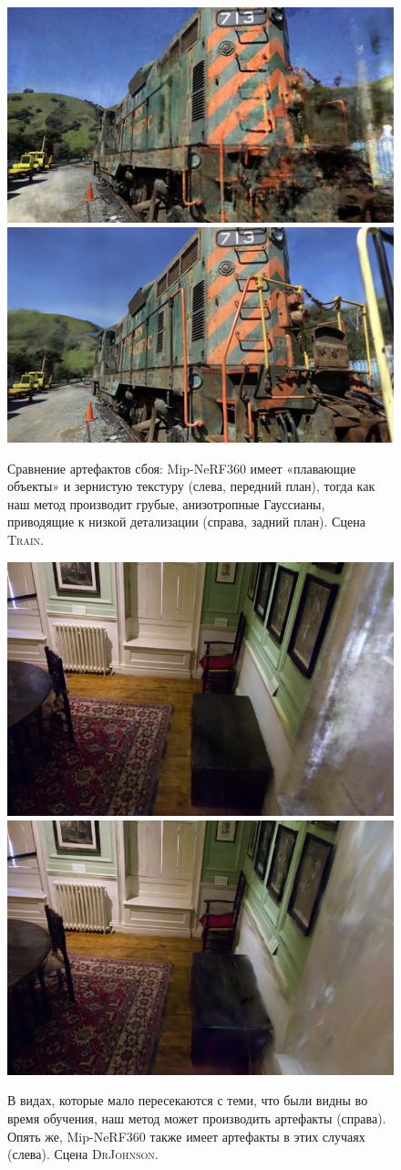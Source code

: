 \begin{figure}[!h]
    \includegraphics[width=0.49\columnwidth]{results/limitations/color_009_s.png}
    \includegraphics[width=0.49\columnwidth]{results/limitations/00073_s.png}
    \caption{
        \label{fig:limit}
        Сравнение артефактов сбоя: Mip-NeRF360 имеет «плавающие объекты» и зернистую текстуру (слева, передний план), тогда как наш метод производит грубые, анизотропные Гауссианы, приводящие к низкой детализации (справа, задний план). Сцена \textsc{Train}.
    }
\end{figure}

\begin{figure}[!h]
    \includegraphics[width=0.49\linewidth]{figures/extremeviews/color_032_s.png}
    \includegraphics[width=0.49\linewidth]{figures/extremeviews/IMG_6589_s.png}
    \caption{
        В видах, которые мало пересекаются с теми, что были видны во время обучения, наш метод может производить артефакты (справа). Опять же, Mip-NeRF360 также имеет артефакты в этих случаях (слева). Сцена \textsc{DrJohnson}.
        \label{fig:limit-under}
    }
\end{figure}